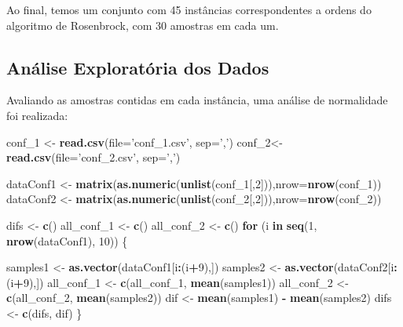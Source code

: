 \documentclass[]{article}
\newenvironment{Shaded}{\begin{snugshade}}{\end{snugshade}}
\newcommand{\ControlFlowTok}[1]{\textcolor[rgb]{0.13,0.29,0.53}{\textbf{#1}}}
\newcommand{\DataTypeTok}[1]{\textcolor[rgb]{0.13,0.29,0.53}{#1}}
\newcommand{\DecValTok}[1]{\textcolor[rgb]{0.00,0.00,0.81}{#1}}
\newcommand{\KeywordTok}[1]{\textcolor[rgb]{0.13,0.29,0.53}{\textbf{#1}}}
\newcommand{\NormalTok}[1]{#1}
\newcommand{\OperatorTok}[1]{\textcolor[rgb]{0.81,0.36,0.00}{\textbf{#1}}}
\newcommand{\StringTok}[1]{\textcolor[rgb]{0.31,0.60,0.02}{#1}}
\begin{document}
Ao final, temos um conjunto com 45 instâncias correspondentes a ordens
do algoritmo de Rosenbrock, com 30 amostras em cada um.

\hypertarget{analise-exploratoria-dos-dados}{%
\subsection{Análise Exploratória dos
Dados}\label{analise-exploratoria-dos-dados}}

Avaliando as amostras contidas em cada instância, uma análise de
normalidade foi realizada:

\begin{Shaded}
\begin{Highlighting}[]
\NormalTok{conf_}\DecValTok{1}\NormalTok{ <-}\StringTok{ }\KeywordTok{read.csv}\NormalTok{(}\DataTypeTok{file=}\StringTok{'conf_1.csv'}\NormalTok{, }\DataTypeTok{sep=}\StringTok{','}\NormalTok{)}
\NormalTok{conf_}\DecValTok{2}\NormalTok{<-}\StringTok{ }\KeywordTok{read.csv}\NormalTok{(}\DataTypeTok{file=}\StringTok{'conf_2.csv'}\NormalTok{, }\DataTypeTok{sep=}\StringTok{','}\NormalTok{)}

\NormalTok{dataConf1 <-}\StringTok{ }\KeywordTok{matrix}\NormalTok{(}\KeywordTok{as.numeric}\NormalTok{(}\KeywordTok{unlist}\NormalTok{(conf_}\DecValTok{1}\NormalTok{[,}\DecValTok{2}\NormalTok{])),}\DataTypeTok{nrow=}\KeywordTok{nrow}\NormalTok{(conf_}\DecValTok{1}\NormalTok{))}
\NormalTok{dataConf2 <-}\StringTok{ }\KeywordTok{matrix}\NormalTok{(}\KeywordTok{as.numeric}\NormalTok{(}\KeywordTok{unlist}\NormalTok{(conf_}\DecValTok{2}\NormalTok{[,}\DecValTok{2}\NormalTok{])),}\DataTypeTok{nrow=}\KeywordTok{nrow}\NormalTok{(conf_}\DecValTok{2}\NormalTok{))}

\NormalTok{difs <-}\StringTok{ }\KeywordTok{c}\NormalTok{()}
\NormalTok{all_conf_}\DecValTok{1}\NormalTok{ <-}\StringTok{ }\KeywordTok{c}\NormalTok{()}
\NormalTok{all_conf_}\DecValTok{2}\NormalTok{ <-}\StringTok{ }\KeywordTok{c}\NormalTok{()}
\ControlFlowTok{for}\NormalTok{ (i  }\ControlFlowTok{in} \KeywordTok{seq}\NormalTok{(}\DecValTok{1}\NormalTok{, }\KeywordTok{nrow}\NormalTok{(dataConf1), }\DecValTok{10}\NormalTok{)) \{}
    
\NormalTok{    samples1 <-}\StringTok{ }\KeywordTok{as.vector}\NormalTok{(dataConf1[i}\OperatorTok{:}\NormalTok{(i}\OperatorTok{+}\DecValTok{9}\NormalTok{),])}
\NormalTok{    samples2 <-}\StringTok{ }\KeywordTok{as.vector}\NormalTok{(dataConf2[i}\OperatorTok{:}\NormalTok{(i}\OperatorTok{+}\DecValTok{9}\NormalTok{),])}
\NormalTok{    all_conf_}\DecValTok{1}\NormalTok{ <-}\StringTok{ }\KeywordTok{c}\NormalTok{(all_conf_}\DecValTok{1}\NormalTok{, }\KeywordTok{mean}\NormalTok{(samples1))}
\NormalTok{    all_conf_}\DecValTok{2}\NormalTok{ <-}\StringTok{ }\KeywordTok{c}\NormalTok{(all_conf_}\DecValTok{2}\NormalTok{, }\KeywordTok{mean}\NormalTok{(samples2))}
\NormalTok{    dif <-}\StringTok{ }\KeywordTok{mean}\NormalTok{(samples1) }\OperatorTok{-}\StringTok{ }\KeywordTok{mean}\NormalTok{(samples2)}
\NormalTok{    difs <-}\StringTok{ }\KeywordTok{c}\NormalTok{(difs, dif)}
\NormalTok{\}}
\end{Highlighting}
\end{Shaded}
\end{document}
